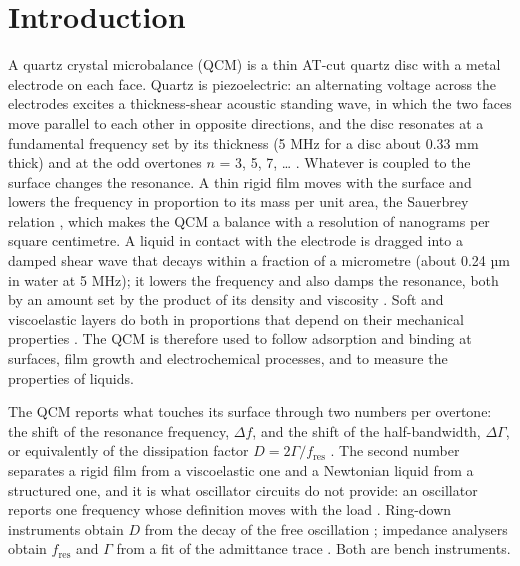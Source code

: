 \documentclass[11pt,a4paper]{article}
\begin{document}
\section{Introduction}

A quartz crystal microbalance (QCM) is a thin AT-cut quartz disc with a metal electrode on each face. Quartz is piezoelectric: an alternating voltage across the electrodes excites a thickness-shear acoustic standing wave, in which the two faces move parallel to each other in opposite directions, and the disc resonates at a fundamental frequency set by its thickness (5 MHz for a disc about 0.33 mm thick) and at the odd overtones $n$ = 3, 5, 7, \ldots{} . Whatever is coupled to the surface changes the resonance. A thin rigid film moves with the surface and lowers the frequency in proportion to its mass per unit area, the Sauerbrey relation \citep{Sauerbrey1959}, which makes the QCM a balance with a resolution of nanograms per square centimetre. A liquid in contact with the electrode is dragged into a damped shear wave that decays within a fraction of a micrometre (about 0.24 µm in water at 5 MHz); it lowers the frequency and also damps the resonance, both by an amount set by the product of its density and viscosity \citep{KanazawaGordon1985AC}. Soft and viscoelastic layers do both in proportions that depend on their mechanical properties \citep{Johannsmann2021}. The QCM is therefore used to follow adsorption and binding at surfaces, film growth and electrochemical processes, and to measure the properties of liquids.

The QCM reports what touches its surface through two numbers per overtone: the shift of the resonance frequency, $\Delta f$, and the shift of the half-bandwidth, $\Delta\Gamma$, or equivalently of the dissipation factor $D = 2\Gamma/f_\mathrm{res}$ \citep{Sauerbrey1959, KanazawaGordon1985AC, Johannsmann2021}. The second number separates a rigid film from a viscoelastic one and a Newtonian liquid from a structured one, and it is what oscillator circuits do not provide: an oscillator reports one frequency whose definition moves with the load \citep{Arnau2008, RodriguezPardo2004}. Ring-down instruments obtain $D$ from the decay of the free oscillation \citep{Rodahl1995}; impedance analysers obtain $f_\mathrm{res}$ and $\Gamma$ from a fit of the admittance trace \citep{Martin1991, Johannsmann2021, JohannsmannReviakine2024}. Both are bench instruments.
\end{document}
